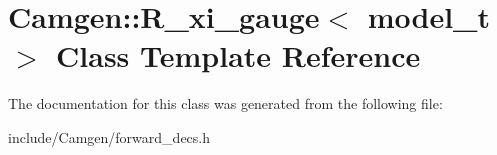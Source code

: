 \hypertarget{a00467}{}\section{Camgen\+:\+:R\+\_\+xi\+\_\+gauge$<$ model\+\_\+t $>$ Class Template Reference}
\label{a00467}


The documentation for this class was generated from the following file\+:\begin{DoxyCompactItemize}
\item 
include/\+Camgen/forward\+\_\+decs.\+h\end{DoxyCompactItemize}
